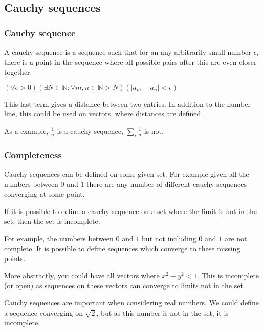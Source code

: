 
\subsection{Cauchy sequences}

\subsubsection{Cauchy sequence}

A cauchy sequence is a sequence such that for an any arbitrarily small number \(\epsilon\), there is a point in the sequence where all possible pairs after this are even closer together.

$(\forall \epsilon >0)(\exists N\in \mathbb{N}: \forall m,n \in \mathbb{N} >N)( |a_m - a_n|<\epsilon)$

This last term gives a distance between two entries. In addition to the number line, this could be used on vectors, where distances are defined.

As a example, \(\frac{1}{n}\) is a cauchy sequence, \(\sum_i \frac{1}{n}\) is not.

\subsubsection{Completeness}

Cauchy sequences can be defined on some given set. For example given all the numbers between \(0\) and \(1\) there are any number of different cauchy sequences converging at some point.

If it is possible to define a cauchy sequence on a set where the limit is not in the set, then the set is incomplete.

For example, the numbers between \(0\) and \(1\) but not including \(0\) and \(1\) are not complete. It is possible to define sequences which converge to these missing points.

More abstractly, you could have all vectors where \(x^2+y^2<1\). This is incomplete (or open) as sequences on these vectors can converge to limits not in the set.

Cauchy sequences are important when considering real numbers. We could define a sequence converging on \(\sqrt 2\), but as this number is not in the set, it is incomplete.

